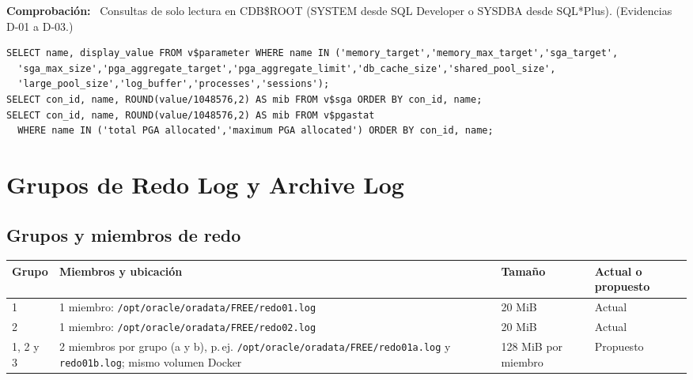 \documentclass[11pt,a4paper]{article}
\DeclareRobustCommand{\_}{\textunderscore\allowbreak}
\newcommand{\tb}[1]{\texttt{#1}}
\newcommand{\campo}[1]{\textbf{#1:}~}                 %
\newcommand{\cab}[1]{\textbf{#1}}
\newcommand{\filacab}{\rowcolor{cabecera}}
\begin{document}
\campo{Comprobación} Consultas de solo lectura en CDB\$ROOT (SYSTEM desde SQL Developer o SYSDBA desde SQL*Plus). (Evidencias D-01 a D-03.)
\begin{lstlisting}
SELECT name, display_value FROM v$parameter WHERE name IN ('memory_target','memory_max_target','sga_target',
  'sga_max_size','pga_aggregate_target','pga_aggregate_limit','db_cache_size','shared_pool_size',
  'large_pool_size','log_buffer','processes','sessions');
SELECT con_id, name, ROUND(value/1048576,2) AS mib FROM v$sga ORDER BY con_id, name;
SELECT con_id, name, ROUND(value/1048576,2) AS mib FROM v$pgastat
  WHERE name IN ('total PGA allocated','maximum PGA allocated') ORDER BY con_id, name;
\end{lstlisting}

\section{Grupos de Redo Log y Archive Log}
\subsection{Grupos y miembros de redo}

{\small
\begin{longtable}{L{1.7cm} L{8.0cm} L{2.4cm} L{2.9cm}}
\toprule\filacab
\cab{Grupo} & \cab{Miembros y ubicación} & \cab{Tamaño} & \cab{Actual o propuesto} \\
\midrule{} & 1 miembro: \tb{/opt/oracle/oradata/FREE/redo01.log} & 20 MiB & Actual \\
2 & 1 miembro: \tb{/opt/oracle/oradata/FREE/redo02.log} & 20 MiB & Actual \\
1, 2 y 3 & 2 miembros por grupo (a y b), p.\,ej. \tb{/opt/oracle/oradata/FREE/redo01a.log} y \tb{redo01b.log}; mismo volumen Docker & 128 MiB por miembro & Propuesto \\
\bottomrule
\end{longtable}}
\end{document}
